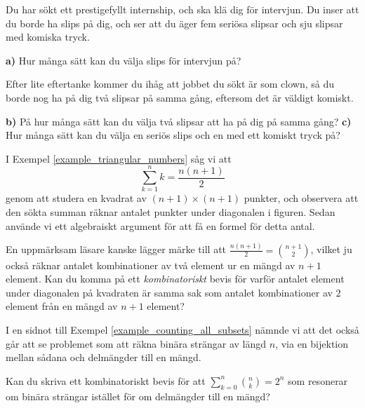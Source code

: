 \documentclass{tufte-handout}
\begin{document}
\begin{xca}
	Du har sökt ett prestigefyllt internship, och ska klä dig för intervjun. Du inser att du borde ha slips på dig, och ser att du äger fem seriösa slipsar och sju slipsar med komiska tryck.
  
	\textbf{a)} Hur många sätt kan du välja slips för intervjun på?
  
	Efter lite eftertanke kommer du ihåg att jobbet du sökt är som clown, så du borde nog ha på dig två slipsar på samma gång, eftersom det är väldigt komiskt.

	\textbf{b)} På hur många sätt kan du välja två slipsar att ha på dig på samma gång? \textbf{c)} Hur många sätt kan du välja en seriös slips och en med ett komiskt tryck på?
\end{xca}

\begin{xca}
	I Exempel \ref{example_triangular_numbers} såg vi att
	$$\sum_{k=1}^n k = \frac{n(n+1)}{2}$$
	genom att studera en kvadrat av $(n+1)\times(n+1)$ punkter, och observera att den sökta summan räknar antalet punkter under diagonalen i figuren. Sedan använde vi ett algebraiskt argument för att få en formel för detta antal.
  
	En uppmärksam läsare kanske lägger märke till att $\frac{n(n+1)}{2} = \binom{n+1}{2}$, vilket ju också räknar antalet kombinationer av två element ur en mängd av $n+1$ element. Kan du komma på ett \emph{kombinatoriskt} bevis för varför antalet element under diagonalen på kvadraten är samma sak som antalet kombinationer av $2$ element från en mängd av $n+1$ element?
  \end{xca}
  
  \begin{xca}
	I en sidnot till Exempel \ref{example_counting_all_subsets} nämnde vi att det också går att se problemet som att räkna binära strängar av längd $n$, via en bijektion mellan sådana och delmängder till en mängd.
  
	Kan du skriva ett kombinatoriskt bevis för att $\sum_{k=0}^n \binom{n}{k} = 2^n$ som resonerar om binära strängar istället för om delmängder till en mängd?
  \end{xca}  



\end{document}
